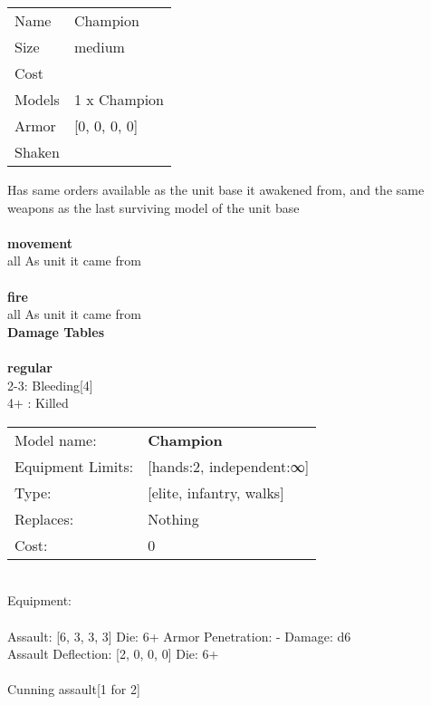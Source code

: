 \begin{tabular}{ll}
  Name & Champion \\
  Size & medium\\
  Cost & \\
  Models & 1 x Champion\\
  Armor & [0, 0, 0, 0]\\
  Shaken & \\
\end{tabular}

\noindent Has same orders available as the unit base it awakened from, and the same weapons as the last surviving model of the unit base\\ 


\ \\ {\bf movement } \\
all As unit it came from \\
\ \\ {\bf fire } \\
all As unit it came from \\


{\bf Damage Tables} \\
\ \\ {\bf regular } \\
2-3: Bleeding[4] \\
4+ : Killed \\


\noindent
\begin{tabular}{ll}
Model name: &{\bf Champion } \\
Equipment Limits: &[hands:2, independent:∞] \\
Type: &[elite, infantry, walks] \\
Replaces: &Nothing \\
Cost: & 0\\
\end{tabular}
\ \\
Equipment:  \\
\ \\
Assault: [6, 3, 3, 3] Die: 6+ Armor Penetration: - Damage: d6 \\
Assault Deflection: [2, 0, 0, 0] Die: 6+\\
\\ 
Cunning assault[1 for 2]\\ 
 
\ \\

\ \\
 
